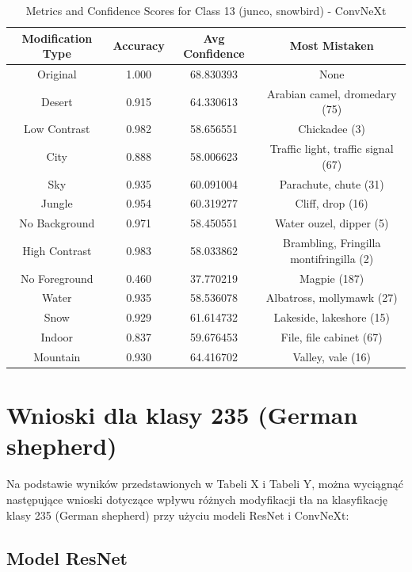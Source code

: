 \begin{table}
	\centering
	\begin{tabular}{|c|c|c|c|}
		\hline
		\textbf{Modification Type} & \textbf{Accuracy} & \textbf{Avg Confidence} & \textbf{Most Mistaken} \\
		\hline
		Original & 1.000 & 68.830393 & None \\
		\hline
		Desert & 0.915 & 64.330613 & Arabian camel, dromedary (75) \\
		\hline
		Low Contrast & 0.982 & 58.656551 & Chickadee (3) \\
		\hline
		City & 0.888 & 58.006623 & Traffic light, traffic signal (67) \\
		\hline
		Sky & 0.935 & 60.091004 & Parachute, chute (31) \\
		\hline
		Jungle & 0.954 & 60.319277 & Cliff, drop (16) \\
		\hline
		No Background & 0.971 & 58.450551 & Water ouzel, dipper (5) \\
		\hline
		High Contrast & 0.983 & 58.033862 & Brambling, Fringilla montifringilla (2) \\
		\hline
		No Foreground & 0.460 & 37.770219 & Magpie (187) \\
		\hline
		Water & 0.935 & 58.536078 & Albatross, mollymawk (27) \\
		\hline
		Snow & 0.929 & 61.614732 & Lakeside, lakeshore (15) \\
		\hline
		Indoor & 0.837 & 59.676453 & File, file cabinet (67) \\
		\hline
		Mountain & 0.930 & 64.416702 & Valley, vale (16) \\
		\hline
	\end{tabular}
	\caption{Metrics and Confidence Scores for Class 13 (junco, snowbird) - ConvNeXt}
	\label{tab:metrics_confidence_class_13_convnext}
\end{table}

\section*{Wnioski dla klasy 235 (German shepherd)}

Na podstawie wyników przedstawionych w Tabeli X i Tabeli Y, można wyciągnąć następujące wnioski dotyczące wpływu różnych modyfikacji tła na klasyfikację klasy 235 (German shepherd) przy użyciu modeli ResNet i ConvNeXt:

\subsection*{Model ResNet}

